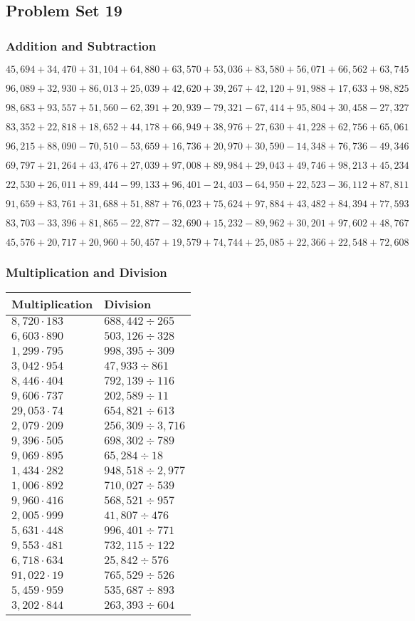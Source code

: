 \hypertarget{problem-set-19-4}{%
\subsection{Problem Set 19}\label{problem-set-19-4}}

\hypertarget{addition-and-subtraction-241}{%
\subsubsection{Addition and
Subtraction}\label{addition-and-subtraction-241}}

\(45,694+34,470+31,104+64,880+63,570+53,036+83,580+56,071+66,562+ 63,745\)

\(96,089+32,930+86,013+25,039+42,620+39,267+42,120+91,988+17,633+98,825\)

\(98,683+93,557+51,560-62,391+20,939-79,321-67,414+95,804+30,458-27,327\)

\(83,352+22,818+18,652+44,178+66,949+38,976+27,630+41,228+62,756+65,061\)

\(96,215+88,090-70,510-53,659+16,736+20,970+30,590-14,348+76,736-49,346\)

\(69,797+21,264+43,476+27,039+97,008+89,984+29,043+49,746+98,213+45,234\)

\(22,530+26,011+89,444-99,133+96,401-24,403-64,950+22,523-36,112+87,811\)

\(91,659+83,761+31,688+51,887+76,023+75,624+97,884+43,482+84,394+77,593\)

\(83,703-33,396+81,865-22,877-32,690+15,232-89,962+30,201+97,602+48,767\)

\(45,576+20,717+20,960+50,457+19,579+74,744+25,085+22,366+22,548+72,608\)

\hypertarget{multiplication-and-division-240}{%
\subsubsection{Multiplication and
Division}\label{multiplication-and-division-240}}

\begin{longtable}[]{@{}ll@{}}
\toprule
Multiplication & Division\tabularnewline
\midrule
\endhead
\(8,720\cdot183\) & \(688,442÷265\)\tabularnewline
\(6,603\cdot890\) & \(503,126÷ 328\)\tabularnewline
\(1,299\cdot795\) & \(998,395÷309\)\tabularnewline
\(3,042\cdot954\) & \(47,933÷861\)\tabularnewline
\(8,446\cdot404\) & \(792,139 ÷116\)\tabularnewline
\(9,606\cdot737\) & \(202,589÷11\)\tabularnewline
\(29,053\cdot74\) & \(654,821÷613\)\tabularnewline
\(2,079\cdot209\) & \(256,309÷3,716\)\tabularnewline
\(9,396\cdot505\) & \(698,302÷789\)\tabularnewline
\(9,069\cdot895\) & \(65,284÷18\)\tabularnewline
\(1,434\cdot282\) & \(948,518÷2,977\)\tabularnewline
\(1,006\cdot892\) & \(710,027÷539\)\tabularnewline
\(9,960\cdot416\) & \(568,521÷957\)\tabularnewline
\(2,005\cdot999\) & \(41,807÷476\)\tabularnewline
\(5,631\cdot448\) & \(996,401÷771\)\tabularnewline
\(9,553\cdot481\) & \(732,115÷122\)\tabularnewline
\(6,718\cdot634\) & \(25,842÷576\)\tabularnewline
\(91,022\cdot19\) & \(765,529÷526\)\tabularnewline
\(5,459\cdot959\) & \(535,687÷893\)\tabularnewline
\(3,202\cdot844\) & \(263,393÷604\)\tabularnewline
\bottomrule
\end{longtable}

